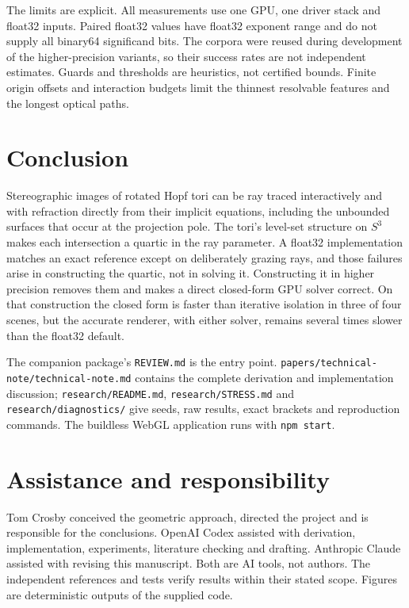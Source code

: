 \documentclass{jcgt}
\providecommand{\passthrough}[1]{#1}
\begin{document}
The limits are explicit. All measurements use one GPU, one driver stack
and float32 inputs. Paired float32 values have float32 exponent range
and do not supply all binary64 significand bits. The corpora were reused
during development of the higher-precision variants, so their success
rates are not independent estimates. Guards and thresholds are
heuristics, not certified bounds. Finite origin offsets and interaction
budgets limit the thinnest resolvable features and the longest optical
paths.

\section{Conclusion}\label{conclusion}

Stereographic images of rotated Hopf tori can be ray traced
interactively and with refraction directly from their implicit
equations, including the unbounded surfaces that occur at the projection
pole. The tori's level-set structure on \(S^3\) makes each intersection
a quartic in the ray parameter. A float32 implementation matches an
exact reference except on deliberately grazing rays, and those failures
arise in constructing the quartic, not in solving it. Constructing it in
higher precision removes them and makes a direct closed-form GPU solver
correct. On that construction the closed form is faster than iterative
isolation in three of four scenes, but the accurate renderer, with
either solver, remains several times slower than the float32 default.

The companion package's \passthrough{\lstinline!REVIEW.md!} is the entry
point. \passthrough{\lstinline!papers/technical-note/technical-note.md!}
contains the complete derivation and implementation discussion;
\passthrough{\lstinline!research/README.md!},
\passthrough{\lstinline!research/STRESS.md!} and
\passthrough{\lstinline!research/diagnostics/!} give seeds, raw results,
exact brackets and reproduction commands. The buildless WebGL
application runs with \passthrough{\lstinline!npm start!}.

\section*{Assistance and
responsibility}\label{assistance-and-responsibility}

Tom Crosby conceived the geometric approach, directed the project and is
responsible for the conclusions. OpenAI Codex assisted with derivation,
implementation, experiments, literature checking and drafting. Anthropic
Claude assisted with revising this manuscript. Both are AI tools, not
authors. The independent references and tests verify results within
their stated scope. Figures are deterministic outputs of the supplied
code.
\end{document}
